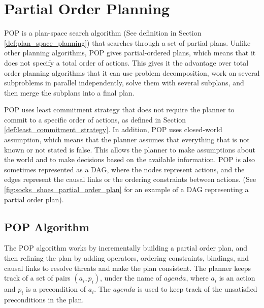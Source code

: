 







\section{Partial Order Planning} \label{sec:partial_order_planning}
\acf{POP} is a plan-space search algorithm (See definition in Section \ref{def:plan_space_planning}) that searches through a set of partial plans.
Unlike other planning algorithms, \ac{POP} gives partial-ordered plans, which means that it does not specify a total order of actions.
This gives it the advantage over total order planning algorithms that it can use problem decomposition, work
on several subproblems in parallel independently, solve them with several subplans, and then merge the subplans into a final plan.


\ac{POP} uses least commitment strategy that does not require the planner to commit to a specific order of actions, as defined in Section \ref{def:least_commitment_strategy}. In addition, \ac{POP} uses closed-world assumption, which means that the planner assumes that everything that is not known or not stated is false. This allows the planner to make assumptions about the world and to make decisions based on the available information.
\ac{POP} is also sometimes represented as a \acf{DAG}, where the nodes represent actions, and the edges represent the causal links or the ordering constraints between actions. (See \autoref{fig:socks_shoes_partial_order_plan} for an example of a \ac{DAG} representing a partial order plan).

\subsection{POP Algorithm} \label{subsec:pop_algorithm}
The \acf{POP} algorithm works by incrementally building a partial order plan, and then refining the plan by adding operators, ordering constraints,
bindings, and causal links to resolve threats and make the plan consistent.
The planner keeps track of a set of pairs $(a_i, p_i)$, under the name of $agenda$, where $a_i$ is an action and $p_i$ is a precondition of $a_i$. The $agenda$ is used to keep track of the unsatisfied preconditions in the plan.


